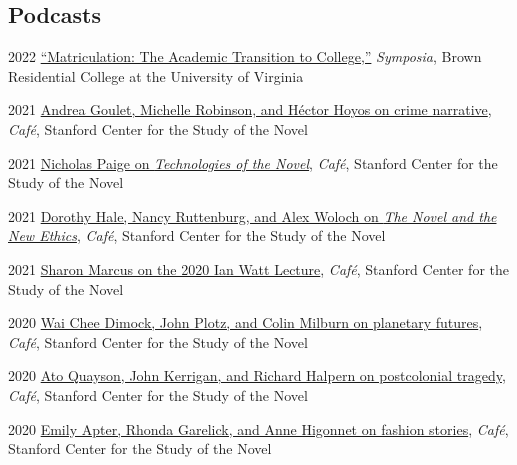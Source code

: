 \documentclass[12pt,letterpaper]{report}
\begin{document}
\subsection*{Podcasts}

\begin{tablist}
	\item[2022] \tab{}\href{https://virginiaaudio.org/\#/symposia/}{\enquote{Matriculation: The Academic Transition to College,}} \emph{Symposia}, Brown Residential College at the University of Virginia
	\item[2021] \tab{}\href{https://web.archive.org/web/20220429010015/https://novel.stanford.edu/csn-cafe/2021/7/23/crime-narratives-with-andrea-goulet-michelle-robinson-and-hctor-hoyos-43021-je87a}{Andrea Goulet, Michelle Robinson, and Héctor Hoyos on crime narrative}, \emph{Café}, Stanford Center for the Study of the Novel
	\item[2021] \tab{}\href{https://web.archive.org/web/20220429093420/https://novel.stanford.edu/csn-cafe/2021/7/23/nicholas-paige-technologies-of-the-novel-2821}{Nicholas Paige on \emph{Technologies of the Novel}}, \emph{Café}, Stanford Center for the Study of the Novel
	\item[2021] \tab{}\href{https://web.archive.org/web/20220429093353/https://novel.stanford.edu/csn-cafe/2021/7/23/books-at-the-center-dorothy-hale-the-novel-and-the-new-ethics-11521}{Dorothy Hale, Nancy Ruttenburg, and Alex Woloch on \emph{The Novel and the New Ethics}}, \emph{Café}, Stanford Center for the Study of the Novel
	\item[2021] \tab{}\href{https://web.archive.org/web/20220429093326/https://novel.stanford.edu/csn-cafe/2021/7/23/sharon-marcus-on-her-ian-watt-lecture-103020}{Sharon Marcus on the 2020 Ian Watt Lecture}, \emph{Café}, Stanford Center for the Study of the Novel
	\item[2020] \tab{}\href{https://web.archive.org/web/20220429010109/https://novel.stanford.edu/csn-cafe/2021/7/23/wai-chee-dimock-john-plotz-and-colin-milburn-on-the-literature-of-planetary-futures-52319}{Wai Chee Dimock, John Plotz, and Colin Milburn on planetary futures}, \emph{Café}, Stanford Center for the Study of the Novel
	\item[2020] \tab{}\href{https://web.archive.org/web/20220429010041/https://novel.stanford.edu/csn-cafe/2021/7/23/ato-quayson-john-kerrigan-and-richard-halpern-on-postcolonial-tragedy-91519}{Ato Quayson, John Kerrigan, and Richard Halpern on postcolonial tragedy}, \emph{Café}, Stanford Center for the Study of the Novel
	\item[2020] \tab{}\href{https://web.archive.org/web/20220429093237/https://novel.stanford.edu/csn-cafe/2021/7/23/fashion-stories-emily-apter-rhonda-garelick-and-anne-higonnet-on-the-cultural-history-of-clothing-1920}{Emily Apter, Rhonda Garelick, and Anne Higonnet on fashion stories}, \emph{Café}, Stanford Center for the Study of the Novel

\end{tablist}
\end{document}
